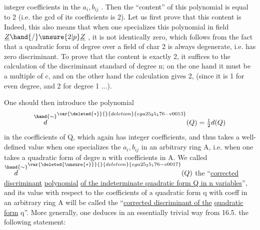 
integer coefficients in the $a_i,b_{ij}$ . Then the ``content'' of this polynomial
is equal to 2 (i.e. the gcd of its coefficients is 2).
 Let us first prove that this content is 
Indeed, this also means that  when one specializes this polynomial
in  field $\underline{Z}\hand{/}\unsure{2|p}\underline{Z}$\hand{)} , it is not identically zero, which 
follows from the fact that a quadratic form of  degree over a field of
char 2 is always degenerate, i.e. has zero discriminant. To prove
that the content  is exactly 2, it suffices to  the calculation of the discriminant
 standard of degree n; on the one hand it must be a multiple of c,
and on the other hand the calculation gives 2, (since it is 1 for even degree, and 2 for
degree 1 ...).

 One should then introduce the polynomial
\[ \overset{\hand{\sim}}{d}^{\var{\deleted{*}}{}{deletion}{ega25_25_176-v0013}}(Q) = \tfrac{1}{2}d(Q) \]
in the coefficients of Q, which again has integer coefficients, and thus
takes a well-defined value when one specializes the $a_i,b_{ij}$ in an
arbitrary ring A, i.e. when one takes a quadratic form  of degre
n with coefficients in A. We called $\overset{\hand{\sim}}{d}^{\var{\deleted{\unsure{*}}}{}{deletion}{ega25_25_176-v0017}}(Q)$ the ``\uline{corrected discriminant} \uline{polynomial}
\uline{of the indeterminate quadratic form Q in n variables}'', and its
value with respect to the coefficients of a quadratic form q with coeff
in an arbitrary ring A will be called the ``\uline{corrected discriminant of the}
\uline{quadratic form} q''. More generally, one deduces in an essentially
trivial way from 16.5. the following statement:

